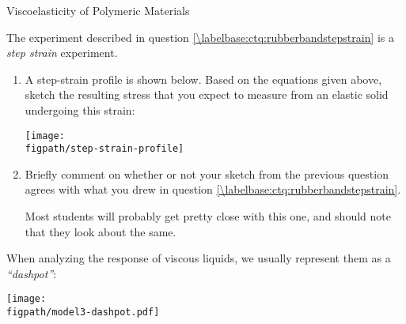 \begin{activity}{Viscoelasticity of Polymeric Materials}
\begin{infobox}
\end{infobox}

\clearpage
\begin{ctqs}
	\question The experiment described in question \ref{\labelbase:ctq:rubberbandstepstrain} is a \emph{step strain} experiment.
	
		\begin{enumerate}
			\item A step-strain profile is shown below.  Based on the equations given above, sketch the resulting stress that you expect to measure from an elastic solid undergoing this strain:
			
				\begin{solution}[3.5in]
					\vspace{6pt}
					\centerline{\texttt{[image: \\figpath/step-strain-profile]}}
					\vspace{6pt}
				\end{solution}
				
			\item Briefly comment on whether or not your sketch from the previous question agrees with what you drew in question \ref{\labelbase:ctq:rubberbandstepstrain}.
			
				\begin{solution}[2in]
					Most students will probably get pretty close with this one, and should note that they look about the same.
				\end{solution}
		\end{enumerate}
\end{ctqs}

\clearpage
\begin{model}

	When analyzing the response of viscous liquids, we usually represent them as a \emph{``dashpot''}:
	
	\vspace{3pt}
	\centerline{\texttt{[image: \\figpath/model3-dashpot.pdf]}}
	

\end{model}
\end{activity}
